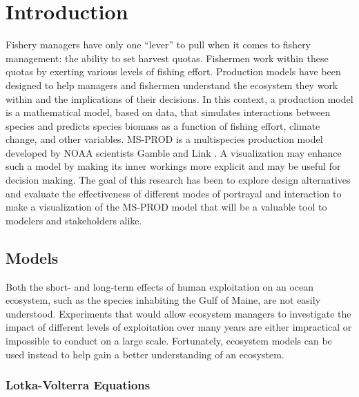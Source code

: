 %

\chapter{Introduction}                %

\renewcommand{\thepart}{{\Roman{part}}}				%

Fishery managers have only one ``lever'' to pull when it comes to fishery management: the ability to set harvest quotas.  Fishermen work within these quotas by exerting various levels of fishing effort.  Production models have been designed to help managers and fishermen understand the ecosystem they work within and the implications of their decisions.  In this context, a production model is a mathematical model, based on data, that simulates interactions between species and predicts species biomass as a function of fishing effort, climate change, and other variables.  MS-PROD is a multispecies production model developed by NOAA scientists Gamble and Link \citeyearpar{gamble2009}.  A visualization may enhance such a model by making its inner workings more explicit and may be useful for decision making. The goal of this research has been to explore design alternatives and evaluate the effectiveness of different modes of portrayal and interaction to make a visualization of the MS-PROD model that will be a valuable tool to modelers and stakeholders alike. 

\section{Models}

Both the short- and long-term effects of human exploitation on an ocean ecosystem, such as the species inhabiting the Gulf of Maine, are not easily understood.  Experiments that would allow ecosystem managers to investigate the impact of different levels of exploitation over many years are either impractical or impossible to conduct on a large scale.  Fortunately, ecosystem models can be used instead to help gain a better understanding of an ecosystem.

\subsection{Lotka-Volterra Equations}

